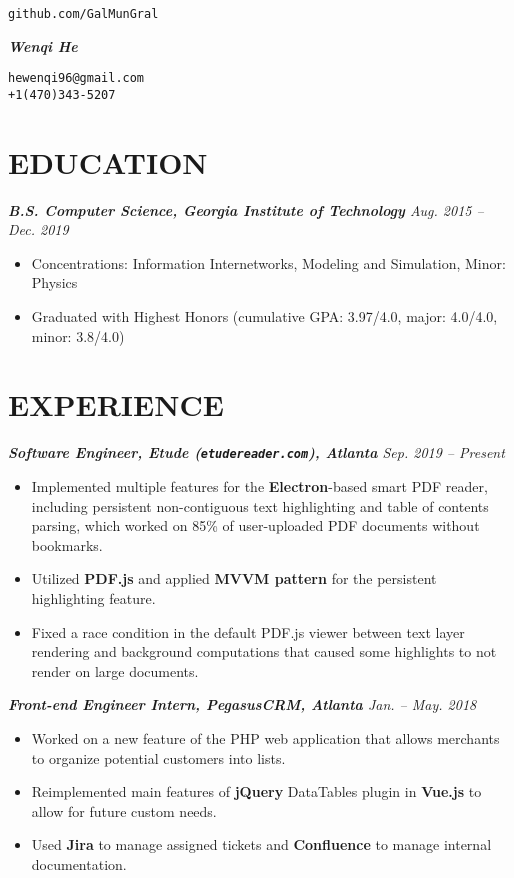 \documentclass[10pt]{article}
\begin{document}
\noindent
\parbox{0.25\textwidth}{\hfill\texttt{github.com/GalMunGral}}
\parbox{0.5\textwidth}{\centerline{\Huge\slshape\bfseries Wenqi He}}
\parbox{0.25\textwidth}{\texttt{hewenqi96@gmail.com\\+1(470)343-5207}}
%
\vspace{-0.5em}
\section*{EDUCATION}
{\itshape 
{\bfseries B.S. Computer Science, Georgia Institute of Technology} \hfill Aug. 2015 -- Dec. 2019}
\begin{itemize}[leftmargin=15pt, noitemsep, topsep=0pt]
	\item Concentrations: Information Internetworks, Modeling and Simulation, Minor: Physics
	\item  Graduated with Highest Honors (cumulative GPA: 3.97/4.0, major: 4.0/4.0, minor: 3.8/4.0)
\end{itemize}
%
\vspace{-0.5em}
\section*{EXPERIENCE}
{\itshape {\bfseries Software Engineer, Etude (\texttt{etudereader.com}), Atlanta} \hfill Sep. 2019 -- Present}
\begin{itemize}[leftmargin=15pt, noitemsep, topsep=0pt]
\item Implemented multiple features for the \textbf{Electron}-based smart PDF reader, including persistent non-contiguous text highlighting and table of contents parsing, which worked on 85\% of user-uploaded PDF documents without bookmarks.
\item Utilized \textbf{PDF.js} and applied \textbf{MVVM pattern} for the persistent highlighting feature.
\item Fixed a race condition in the default PDF.js viewer between text layer rendering and background computations that caused some highlights to not render on large documents.
\end{itemize}
\vspace{0.5em}
%
{\itshape {\bfseries Front-end Engineer Intern, PegasusCRM, Atlanta} \hfill Jan. -- May. 2018}
\begin{itemize}[leftmargin=15pt, noitemsep, topsep=0pt]
\item Worked on a new feature of the PHP web application that allows merchants to organize potential customers into lists.
	\item Reimplemented main features of \textbf{jQuery} DataTables plugin in \textbf{Vue.js} to allow for future custom needs.
	\item Used \textbf{Jira} to manage assigned tickets and \textbf{Confluence} to manage internal documentation.
\end{itemize}
%
\vspace{-0.5em}
\end{document}

